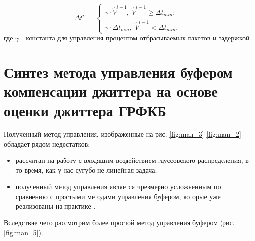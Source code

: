 \begin{equation}\label{eq41:syntes5}
\Delta t^i= \;
\begin{cases}
\gamma\cdot\hat{V}^{i-1}, \; \hat{V}^{i-1} \geq \Delta t_{min}; \\    
\gamma\cdot\Delta t_{min}, \;  \hat{V}^{i-1} < \Delta t_{min},    
\end{cases}
\end{equation}
\noindent где $\gamma$ - константа для управления процентом отбрасываемых пакетов и задержкой.


\section{Синтез метода управления буфером компенсации джиттера на основе оценки джиттера ГРФКБ}

Полученный метод управления, изображенные на рис. \ref{fig:man_3}-\ref{fig:man_2} обладает рядом недостатков:
\begin{itemize}
 \item рассчитан на работу с входящим воздействием гауссовского распределения, в то время, как у нас сугубо не линейная задача;
 \item полученный метод управления является чрезмерно усложненным по сравнению с простыми методами управления буфером, которые уже реализованы на практике \cite{Moon,jesuspinto1999algorithms,YoungJongChoChongKwanUn19941385,DBLP:journals/iet-com/Gade07,Hafskjold:2003:AAO:963600.963677}.  
\end{itemize}

Вследствие чего рассмотрим более простой метод управления буфером (рис. \ref{fig:man_5}).

